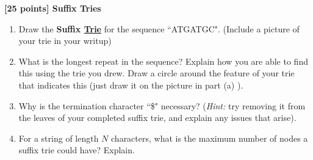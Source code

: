 {\bf [25 points] Suffix Tries}\\

\vspace{0.1in}

\begin{enumerate}
    \item Draw the \textbf{Suffix \underline{Trie}} for the sequence ``ATGATGC". (Include a picture of your trie in your writup)
    \item What is the longest repeat in the sequence? Explain how you are able to find this using the trie you drew. Draw a circle around the feature of your trie that indicates this (just draw it on the picture in part (a) ).
    \item Why is the termination character ``\$" necessary? (\textit{Hint:} try removing it from the leaves of your completed suffix trie, and explain any issues that arise).
    \item For a string of length $N$ characters, what is the maximum number of nodes a suffix trie could have? Explain.
\end{enumerate}

